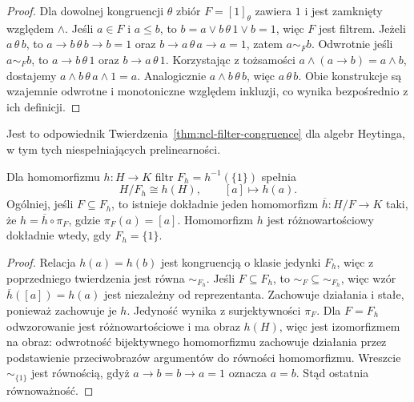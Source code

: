 \begin{proof}
Dla dowolnej kongruencji $\theta$ zbiór
$F=[1]_\theta$ zawiera $1$ i jest zamknięty
względem $\wedge$. Jeśli $a\in F$ i $a\leq b$,
to $b=a\vee b\,\theta\,1\vee b=1$, więc $F$
jest filtrem. Jeżeli $a\,\theta\,b$, to
$a\to b\,\theta\,b\to b=1$ oraz
$b\to a\,\theta\,a\to a=1$, zatem $a\sim_F b$.
Odwrotnie jeśli $a\sim_F b$, to
$a\to b\,\theta\,1$ oraz $b\to a\,\theta\,1$.
Korzystając z tożsamości
$a\wedge(a\to b)=a\wedge b$, dostajemy
$a\wedge b\,\theta\,a\wedge1=a$.
Analogicznie $a\wedge b\,\theta\,b$, więc
$a\,\theta\,b$.
Obie konstrukcje są wzajemnie odwrotne i
monotoniczne względem inkluzji, co wynika
bezpośrednio z ich definicji.
\end{proof}
Jest to odpowiednik Twierdzenia~\ref{thm:ncl-filter-congruence}
dla algebr Heytinga, w tym tych niespełniających
prelinearności.

\begin{wniosek}
\label{cor:ncl-heyting-quotient-universal}
Dla homomorfizmu $h:H\to K$ filtr
$F_h=h^{-1}(\{1\})$ spełnia
\[
 H/F_h\cong h(H),\qquad [a]\longmapsto h(a).
\]
Ogólniej, jeśli $F\subseteq F_h$, to istnieje
dokładnie jeden homomorfizm $\overline h:H/F\to K$
taki, że $h=\overline h\circ\pi_F$, gdzie
$\pi_F(a)=[a]$.
Homomorfizm $h$ jest różnowartościowy dokładnie
wtedy, gdy $F_h=\{1\}$.
\end{wniosek}
\begin{proof}
Relacja $h(a)=h(b)$ jest kongruencją o klasie
jedynki $F_h$, więc z poprzedniego twierdzenia
jest równa $\sim_{F_h}$.
Jeśli $F\subseteq F_h$, to $\sim_F\subseteq\sim_{F_h}$,
więc wzór $\overline h([a])=h(a)$ jest niezależny
od reprezentanta. Zachowuje działania i stałe,
ponieważ zachowuje je $h$. Jedyność wynika
z surjektywności $\pi_F$.
Dla $F=F_h$ odwzorowanie jest różnowartościowe
i ma obraz $h(H)$, więc jest izomorfizmem na obraz:
odwrotność bijektywnego homomorfizmu zachowuje
działania przez podstawienie przeciwobrazów
argumentów do równości homomorfizmu.
Wreszcie $\sim_{\{1\}}$ jest równością,
gdyż $a\to b=b\to a=1$ oznacza $a=b$.
Stąd ostatnia równoważność.
\end{proof}


